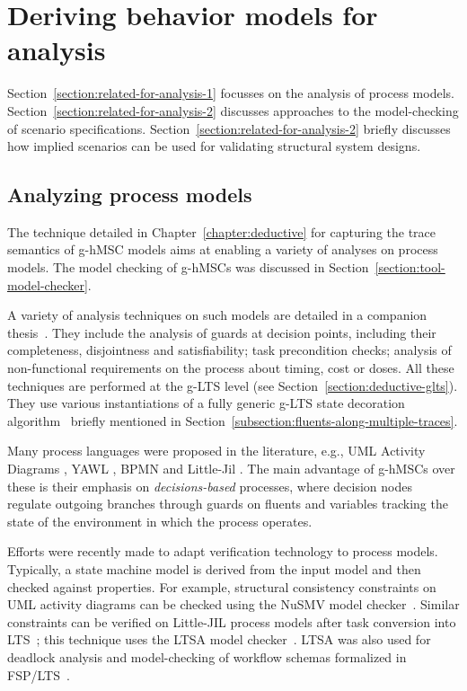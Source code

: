 \section{Deriving behavior models for analysis\label{section:related-for-analysis}}

Section~\ref{section:related-for-analysis-1} focusses on the analysis of process models. Section~\ref{section:related-for-analysis-2} discusses approaches to the model-checking of scenario specifications. Section~\ref{section:related-for-analysis-2} briefly discusses how implied scenarios can be used for validating structural system designs.


\subsection{Analyzing process models\label{section:related-for-analysis-1}}

The technique detailed in Chapter~\ref{chapter:deductive} for capturing the trace semantics of g-hMSC models aims at enabling a variety of analyses on process models. The model checking of g-hMSCs was discussed in Section~\ref{section:tool-model-checker}. 

A variety of analysis techniques on such models are detailed in a companion thesis~\cite{Damas:2011}. They include the analysis of guards at decision points, including their completeness, disjointness and satisfiability; task precondition checks; analysis of non-functional requirements on the process about timing, cost or doses. All these techniques are performed at the g-LTS level (see Section~\ref{section:deductive-glts}). They use various instantiations of a fully generic g-LTS state decoration algorithm~\cite{Damas:2011} briefly mentioned in Section~\ref{subsection:fluents-along-multiple-traces}.

Many process languages were proposed in the literature, e.g., UML Activity Diagrams \cite{OMG:2004}, YAWL \cite{Vanderaalst:2005}, BPMN \cite{OMG:2008} and Little-Jil \cite{Clarke:2008}. The main advantage of g-hMSCs over these is their emphasis on \emph{decisions-based} processes, where decision nodes regulate outgoing branches through guards on fluents and variables tracking the state of the environment in which the process operates.

Efforts were recently made to adapt verification technology to process models. Typically, a state machine model is derived from the input model and then checked against properties. For example, structural consistency constraints on UML activity diagrams can be checked using the NuSMV model checker~\cite{Eshuis:2006}. Similar constraints can be verified on Little-JIL process models after task conversion into LTS~\cite{Lerner:2004}; this technique uses the LTSA model checker~\cite{Magee:1999}. LTSA was also used for deadlock analysis and model-checking of workflow schemas formalized in FSP/LTS~\cite{Karamanolis:2000}.

